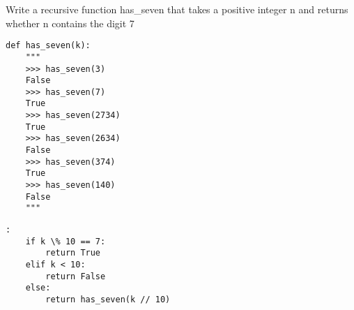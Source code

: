 \begin{blocksection}
\question Write a recursive function has_seven that takes a positive integer n and returns whether n contains the digit 7

\begin{lstlisting}
def has_seven(k):
    """
    >>> has_seven(3)
    False
    >>> has_seven(7)
    True
    >>> has_seven(2734)
    True
    >>> has_seven(2634)
    False
    >>> has_seven(374)
    True
    >>> has_seven(140)
    False
    """
\end{lstlisting}

\begin{solution}[1in]
\begin{lstlisting}:
    if k \% 10 == 7:
        return True
    elif k < 10:
        return False
    else:
        return has_seven(k // 10)
\end{lstlisting}
\end{solution}
\end{blocksection}
